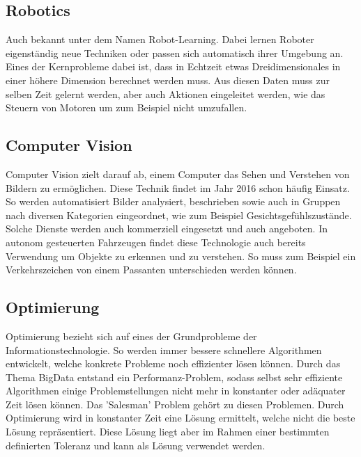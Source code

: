 \subsection{Robotics}
\label{subsec:Robotics}

Auch bekannt unter dem Namen Robot-Learning. 
Dabei lernen Roboter eigenständig neue Techniken oder passen sich automatisch ihrer Umgebung an. 
Eines der Kernprobleme dabei ist, dass in Echtzeit etwas Dreidimensionales in einer höhere Dimension berechnet werden muss.
Aus diesen Daten muss zur selben Zeit gelernt werden, aber auch Aktionen eingeleitet werden, wie das Steuern von Motoren um zum Beispiel nicht umzufallen.

\subsection{Computer Vision}
\label{subsec:Cumputer Vision}

Computer Vision zielt darauf ab, einem Computer das Sehen und Verstehen von Bildern zu ermöglichen. 
Diese Technik findet im Jahr 2016 schon häufig Einsatz. 
So werden automatisiert Bilder analysiert, beschrieben sowie auch in Gruppen nach diversen Kategorien eingeordnet, wie zum Beispiel Gesichtsgefühlszustände.
Solche Dienste werden auch kommerziell eingesetzt und auch angeboten. 
In autonom gesteuerten Fahrzeugen findet diese Technologie auch bereits Verwendung um Objekte zu erkennen und zu verstehen. 
So muss zum Beispiel ein Verkehrszeichen von einem Passanten unterschieden werden können.

\subsection{Optimierung}
\label{subsec:Optimization}

Optimierung bezieht sich auf eines der Grundprobleme der Informationstechnologie. 
So werden immer bessere schnellere Algorithmen entwickelt, welche konkrete Probleme noch effizienter lösen können. 
Durch das Thema BigData entstand ein Performanz-Problem, sodass selbst sehr effiziente Algorithmen einige Problemstellungen nicht mehr in konstanter oder adäquater Zeit lösen können. 
Das 'Salesman' Problem gehört zu diesen Problemen. 
Durch Optimierung wird in konstanter Zeit eine Lösung ermittelt, welche nicht die beste Lösung repräsentiert. 
Diese Lösung liegt aber im Rahmen einer bestimmten definierten Toleranz und kann als Lösung verwendet werden. \cite{AI3}

